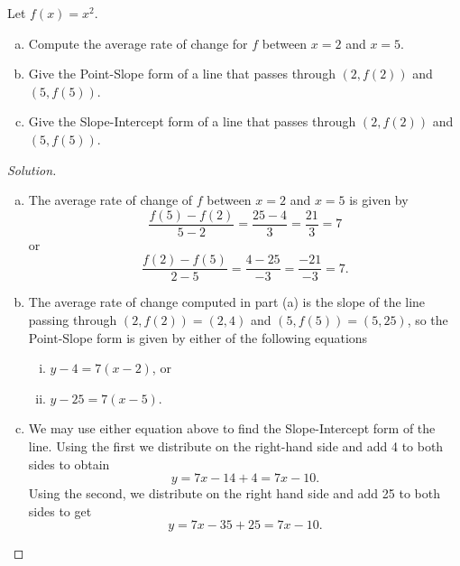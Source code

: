 \documentclass[12pt]{amsart}
\begin{document}
\begin{thm}[16 Points]\label{ex9}
  Let $f(x) = x^2$.
  \begin{enumerate}[(a)]
  \item
    Compute the average rate of change for $f$ between $x = 2$ and $x = 5$.
  \item
    Give the Point-Slope form of a line that passes through $(2, f(2))$ and $(5, f(5))$.
  \item
    Give the Slope-Intercept form of a line that passes through $(2, f(2))$ and $(5, f(5))$.
  \end{enumerate}
  
  \begin{proof}[Solution]
    \begin{enumerate}[(a)]
    \item
      The average rate of change of $f$ between $x = 2$ and $x = 5$ is given by
      $$\frac{f(5) - f(2)}{5 - 2} = \frac{25 - 4}{3} = \frac{21}{3} = 7$$
      or
      $$\frac{f(2) - f(5)}{2 - 5} = \frac{4 - 25}{-3} = \frac{-21}{-3} = 7.$$
    \item
      The average rate of change computed in part (a) is the slope of the line passing through $(2, f(2)) = (2,4)$ and $(5, f(5)) = (5, 25)$, so the Point-Slope form is given by either of the following equations
      \begin{enumerate}[(i)]
      \item
        $y - 4 = 7(x - 2)$, or
      \item
        $y - 25 = 7(x - 5)$.
      \end{enumerate}
    \item
      We may use either equation above to find the Slope-Intercept form of the line.  
      Using the first we distribute on the right-hand side and add 4 to both sides to obtain
      $$y = 7x - 14 + 4 = 7x - 10.$$
      Using the second, we distribute on the right hand side and add 25 to both sides to get
      $$y = 7x - 35 + 25 = 7x - 10.$$
    \end{enumerate}
  \end{proof}
\end{thm}
\end{document}
